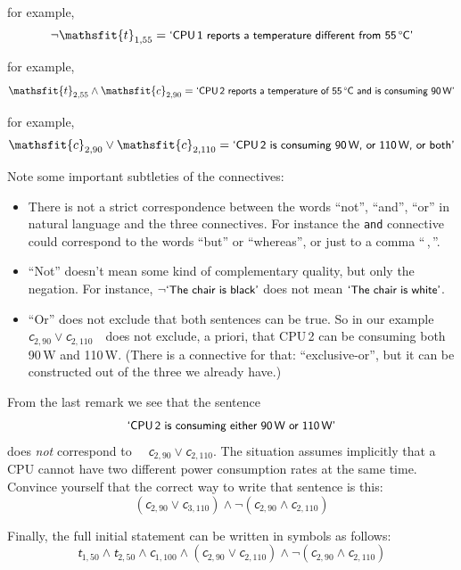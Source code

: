 \documentclass[
  a4paper,
  DIV=11,
  numbers=noendperiod,
  oneside]{scrreprt}
\providecommand{\tightlist}{%
  \setlength{\itemsep}{0pt}\setlength{\parskip}{0pt}}\usepackage{longtable,booktabs,array}
\begin{document}
\begin{description}
\tightlist
\item[{Not:~~\(\lnot\)}]
for example, \[
\lnot \mathsfit{t}_{1,55} = \textsf{\small`CPU\,1 reports a temperature different from 55\,°C'}
\]
\item[{And:~~\(\land\)}]
for example, \[
\mathsfit{t}_{2,55} \land \mathsfit{c}_{2,90} = \textsf{\small`CPU\,2 reports a temperature of 55\,°C and is consuming 90\,W'}
\]
\item[{Or:~~\(\lor\)}]
for example, \[
\mathsfit{c}_{2,90} \lor \mathsfit{c}_{2,110} = \textsf{\small`CPU\,2 is consuming 90\,W, or 110\,W, or both'}
\]
\end{description}

Note some important subtleties of the connectives:

\begin{itemize}
\item
  There is not a strict correspondence between the words ``not'',
  ``and'', ``or'' in natural language and the three connectives. For
  instance the \texttt{and} connective could correspond to the words
  ``but'' or ``whereas'', or just to a comma ``\,,\,''.
\item
  ``Not'' doesn't mean some kind of complementary quality, but only the
  negation. For instance, \(\lnot\textsf{\small`The chair is black'}\)
  does not mean \(\textsf{\small`The chair is white'}\).
\item
  ``Or'' does not exclude that both sentences can be true. So in our
  example~~\(\mathsfit{c}_{2,90} \lor \mathsfit{c}_{2,110}\)~~does not
  exclude, a priori, that CPU\,2 can be consuming both 90\,W and 110\,W.
  (There is a connective for that: ``exclusive-or'', but it can be
  constructed out of the three we already have.)
\end{itemize}

From the last remark we see that the sentence \[
\textsf{\small`CPU\,2 is consuming either 90\,W or 110\,W'}
\] does \emph{not} correspond to
~~\(\mathsfit{c}_{2,90} \lor \mathsfit{c}_{2,110}\). The situation
assumes implicitly that a CPU cannot have two different power
consumption rates at the same time. Convince yourself that the correct
way to write that sentence is this: \[
(\mathsfit{c}_{2,90} \lor \mathsfit{c}_{3,110})
\land
\lnot(\mathsfit{c}_{2,90} \land \mathsfit{c}_{2,110})
\]

Finally, the full initial statement can be written in symbols as
follows: \[
\mathsfit{t}_{1,50} \land \mathsfit{t}_{2,50} 
\land \mathsfit{c}_{1,100} 
\land (\mathsfit{c}_{2,90} \lor \mathsfit{c}_{2,110})
\land
\lnot(\mathsfit{c}_{2,90} \land \mathsfit{c}_{2,110})
\]
\end{document}
